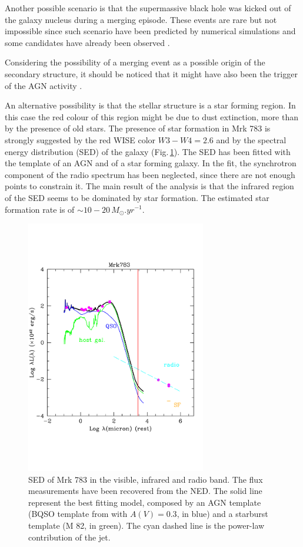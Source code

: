 \documentclass[../main.tex]{subfiles}
\begin{document}
Another possible scenario is that the supermassive black hole was kicked out of the galaxy nucleus during a merging episode.
These events are rare but not impossible since such scenario have been predicted by numerical simulations and some candidates have already been observed \citep[for a review see][]{Komossa12}.

Considering the possibility of a merging event as a possible origin of the secondary structure, it should be noticed that it might have also been the trigger of the AGN activity \citep{Hong15}.

An alternative possibility is that the stellar structure is a star forming region.
In this case the red colour of this region might be due to dust extinction, more than by the presence of old stars.
The presence of star formation in Mrk 783 is strongly suggested by the red WISE color $W3-W4=2.6$ and by the spectral energy distribution (SED) of the galaxy (Fig.\,\ref{fig:SED_mrk}).
The SED has been fitted with the template of an AGN and of a star forming galaxy.
In the fit, the synchrotron component of the radio spectrum has been neglected, since there are not enough points to constrain it.
The main result of the analysis is that the infrared region of the SED seems to be dominated by star formation.
The estimated star formation rate is of $\sim 10-20\,\si{M_{\odot}.yr^{-1}}$.

\begin{figure}
\centering
\includegraphics[width=0.7\textwidth]{images/paper3/mrk783_senza_UVOT.pdf} 
\caption[]{SED of Mrk 783 in the visible, infrared and radio band. The flux measurements have been recovered from the NED. The solid line represent the best fitting model, composed by an AGN template (BQSO template from \cite{polletta07} with $A(V)=0.3$, in blue) and a starburst template (M 82, in green).
The cyan dashed line is the power-law contribution of the jet.} 
\label{fig:SED_mrk}
\end{figure} 
\end{document}
